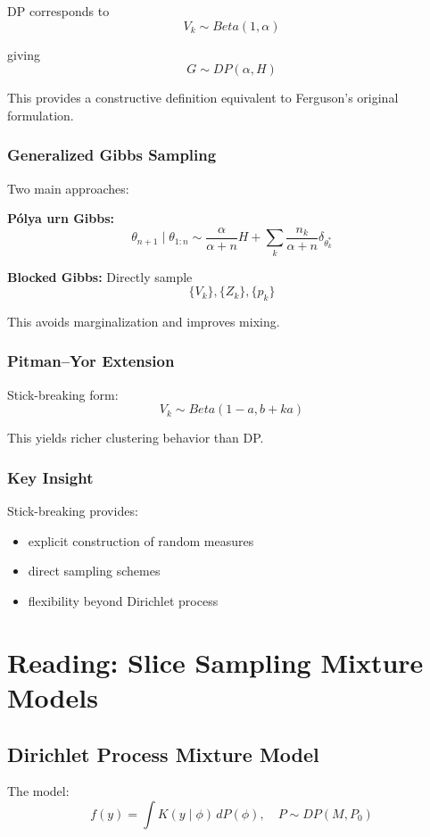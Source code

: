 \documentclass[12pt,oneside]{book}
\numberwithin{equation}{section}
\theoremstyle{definition}
\theoremstyle{plain}
\theoremstyle{remark}
\begin{document}
DP corresponds to
\[
V_k \sim Beta(1, \alpha)
\]

giving
\[
G \sim DP(\alpha, H)
\]

This provides a constructive definition equivalent to Ferguson’s original formulation.

\subsubsection*{Generalized Gibbs Sampling}

Two main approaches:

\textbf{Pólya urn Gibbs:}
\[
\theta_{n+1} \mid \theta_{1:n}
\sim
\frac{\alpha}{\alpha+n} H + \sum_{k} \frac{n_k}{\alpha+n} \delta_{\theta_k^*}
\]

\textbf{Blocked Gibbs:}
Directly sample
\[
\{V_k\}, \{Z_k\}, \{p_k\}
\]

This avoids marginalization and improves mixing.

\subsubsection*{Pitman–Yor Extension}

Stick-breaking form:
\[
V_k \sim Beta(1-a, b + ka)
\]

This yields richer clustering behavior than DP.

\subsubsection*{Key Insight}

Stick-breaking provides:

\begin{itemize}
\item explicit construction of random measures
\item direct sampling schemes
\item flexibility beyond Dirichlet process
\end{itemize}

\section{Reading: Slice Sampling Mixture Models}

\subsection*{Dirichlet Process Mixture Model}

The model:
\[
f(y) = \int K(y \mid \phi)\, dP(\phi), \quad P \sim DP(M, P_0)
\]
\end{document}
